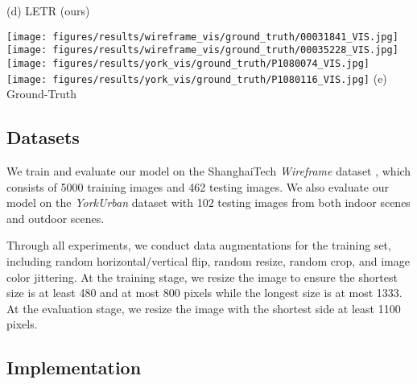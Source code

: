 \documentclass[final]{cvpr}
\begin{document}
\begin{figure*}
\begin{minipage}[t]{0.19\linewidth}
    {\small (d) LETR (ours)}
    \end{minipage}\hfill
    \begin{minipage}[t]{0.19\linewidth}\centering
    \texttt{[image: figures/results/wireframe\_vis/ground\_truth/00031841\_VIS.jpg]}
    \texttt{[image: figures/results/wireframe\_vis/ground\_truth/00035228\_VIS.jpg]}
    \texttt{[image: figures/results/york\_vis/ground\_truth/P1080074\_VIS.jpg]}
    \texttt{[image: figures/results/york\_vis/ground\_truth/P1080116\_VIS.jpg]}
    {\small (e) Ground-Truth}
    \end{minipage}
    \vspace{2mm}
    \caption{\textbf{Qualitative evaluation of line detection methods.} From left to right: the columns are the results from AFM \cite{xue2019learning},  LCNN \cite{zhou2019end}, HAWP \cite{xue2020holistically},  LETR (ours) and the ground-truth. From top to bottom: the top two rows are the results from the Wireframe test set, and the bottom two rows are the results from the YorkUrban test set.
    }
    \label{fig:qualitative}
\vspace{-2mm}
\end{figure*}

\subsection{Datasets}
We train and evaluate our model on the ShanghaiTech \textit{Wireframe} dataset \cite{huang2018learning}, which consists of 5000 training images and 462 testing images. We also evaluate our model on the \textit{YorkUrban} dataset \cite{denis2008efficient} with 102 testing images from both indoor scenes and outdoor scenes.

Through all experiments, we conduct data augmentations for the training set, including random horizontal/vertical flip, random resize, random crop, and image color jittering. At the training stage, we resize the image to ensure the shortest size is at least 480 and at most 800 pixels while the longest size is at most 1333. At the evaluation stage, we resize the image with the shortest side at least 1100 pixels.

\subsection{Implementation}
\end{document}

